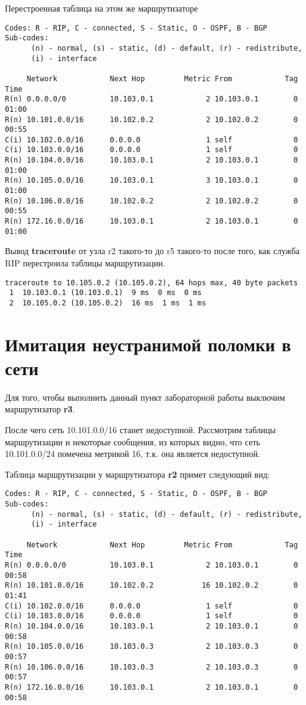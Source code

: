 \documentclass[a4paper,12pt]{article}
\begin{document}
Перестроенная таблица на этом же маршрутизаторе
\begin{Verbatim}
Codes: R - RIP, C - connected, S - Static, O - OSPF, B - BGP
Sub-codes:
      (n) - normal, (s) - static, (d) - default, (r) - redistribute,
      (i) - interface

     Network            Next Hop         Metric From            Tag Time
R(n) 0.0.0.0/0          10.103.0.1            2 10.103.0.1        0 01:00
R(n) 10.101.0.0/16      10.102.0.2            2 10.102.0.2        0 00:55
C(i) 10.102.0.0/16      0.0.0.0               1 self              0
C(i) 10.103.0.0/16      0.0.0.0               1 self              0
R(n) 10.104.0.0/16      10.103.0.1            2 10.103.0.1        0 01:00
R(n) 10.105.0.0/16      10.103.0.1            3 10.103.0.1        0 01:00
R(n) 10.106.0.0/16      10.102.0.2            2 10.102.0.2        0 00:55
R(n) 172.16.0.0/16      10.103.0.1            2 10.103.0.1        0 01:00
\end{Verbatim}

Вывод \textbf{traceroute} от узла r2 такого-то до r5 такого-то после того, как служба RIP перестроила таблицы маршрутизации.
\begin{Verbatim}
traceroute to 10.105.0.2 (10.105.0.2), 64 hops max, 40 byte packets
 1  10.103.0.1 (10.103.0.1)  9 ms  0 ms  0 ms
 2  10.105.0.2 (10.105.0.2)  16 ms  1 ms  1 ms
\end{Verbatim}

\section{Имитация неустранимой поломки в сети}

Для того, чтобы выполнить данный пункт лабораторной работы выключим
маршрутизатор \textbf{r3}.

После чего сеть 10.101.0.0/16 станет недоступной. Рассмотрим таблицы
маршрутизации и некоторые сообщения, из которых видно, что сеть 10.101.0.0/24
помечена метрикой 16, т.к. она является недоступной.

Таблица маршрутизации у маршрутизатора \textbf{r2} примет следующий вид:

\begin{Verbatim}
Codes: R - RIP, C - connected, S - Static, O - OSPF, B - BGP
Sub-codes:
      (n) - normal, (s) - static, (d) - default, (r) - redistribute,
      (i) - interface

     Network            Next Hop         Metric From            Tag Time
R(n) 0.0.0.0/0          10.103.0.1            2 10.103.0.1        0 00:58
R(n) 10.101.0.0/16      10.102.0.2           16 10.102.0.2        0 01:41
C(i) 10.102.0.0/16      0.0.0.0               1 self              0
C(i) 10.103.0.0/16      0.0.0.0               1 self              0
R(n) 10.104.0.0/16      10.103.0.1            2 10.103.0.1        0 00:58
R(n) 10.105.0.0/16      10.103.0.3            2 10.103.0.3        0 00:57
R(n) 10.106.0.0/16      10.103.0.3            2 10.103.0.3        0 00:57
R(n) 172.16.0.0/16      10.103.0.1            2 10.103.0.1        0 00:58
\end{Verbatim}
\end{document}
